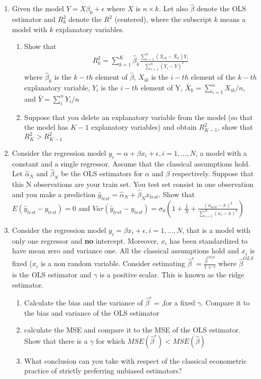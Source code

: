 \documentclass[12pt,onecolumn]{article}
\begin{document}
\begin{enumerate}
  \item Given the model $Y = X \beta_0 + \epsilon$ where $X$ is $n \times k$. Let also $\hat \beta$ denote the OLS estimator and $R^2_k$ denote the  $R^2$ (centered), where the subscript $k$ means a model with $k$ explanatory variables.
  \begin{enumerate}
    \item Show that 
    \begin{align}
      R^2_k = \sum_{k=1}^K \hat \beta_k \frac{\sum_{i=1}^n (X_{ik}-\bar{X}_k)Y_i}{\sum_{i=1}^n (Y_i-\bar Y)^2}
    \end{align}
    where $\hat \beta_k$ is the $k-th$ element of $\hat \beta$, $X_{ik}$ is the $i-th$ element of the $k-th$ explanatory variable, $Y_i$ is the $i-th$ element of Y, $\bar X_k = \sum_{i=1}^n X_{ik}/n$, and $\bar Y = \sum_i^n Y_i/n$
    \item Suppose that you delete an explanatory variable from the model (so that the model has $K-1$ explanatory variables) and obtain $R^2_{K-1}$, show that $R^2_{K}>R^2_{K-1}$
  \end{enumerate}
        
  \item Consider the regression model $y_i = \alpha +\beta x_i +\epsilon, i=1,...,N$, a model with a constant and a single regressor. Assume that the classical assumptions hold. Let $\hat \alpha_N$ and $\hat \beta_N$ be the OLS estimators for $\alpha$ and $\beta$ respectively. Suppose that this N observations are your train set. You test set consist in one observation and you make a prediction $\hat y_{test}=\hat \alpha_N + \hat \beta_N x_{test}$. Show that $E(\hat y_{test}-y_{test})=0$ and $Var(\hat y_{test}-y_{test})=\sigma_0 \left( 1+\frac{1}{N}+\frac{(x_{test}-\bar x)^2}{\sum_{i=1}^N (x_i-\bar x)^2 }\right)$
  
  
  
  
  \item Consider the regression model $y_i =  \beta x_i +\epsilon, i=1,...,N$, that is a model with only one regressor and {\bf no} intercept. Moreover, $x_i$ has been standardized to have mean zero and variance one. All the classical assumptions hold and $x_i$ is fixed ($x_i$ is a non random variable. Consider estimating $\hat \beta^r= \frac{\hat \beta^{OLS}}{1+\gamma}$ where $\hat \beta^{OLS}$ is the OLS estimator and $\gamma$ is a positive scalar. This is known as the ridge estimator.
  \begin{enumerate}
	  \item Calculate the bias and the variance of $\hat \beta^r=$,for a fixed $\gamma$. Compare it to the bias and variance of the OLS estimator
	  \item calculate the MSE and compare it to the MSE of the OLS estimator. Show that there is a $\gamma$ for which $MSE(\hat \beta^r)<MSE(\hat \beta)$
	  \item What conclusion can you take with respect of the classical econometric practice of strictly preferring unbiased estimators?
\end{enumerate}
  
  

\end{enumerate}
\end{document}
